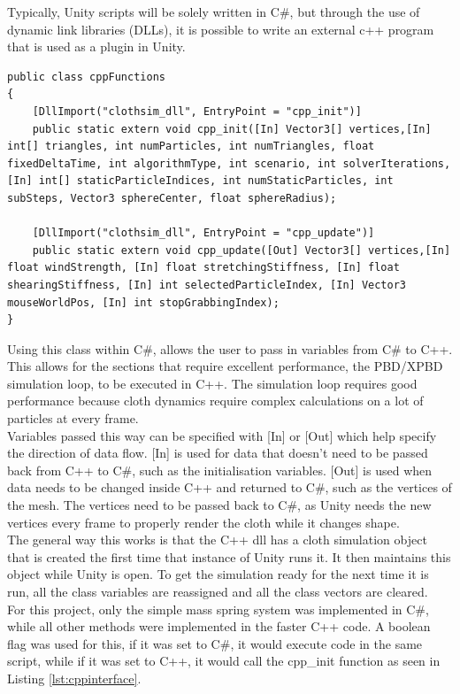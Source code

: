\documentclass[12pt,a4paper]{article}
\begin{document}
Typically, Unity scripts will be solely written in C\#, but through the use of dynamic link libraries (DLLs), it is possible to write an external c++ program that is used as a plugin in Unity.

\begin{lstlisting}[caption={Interfacing C++ functions with Unity},label={lst:cppinterface}]
public class cppFunctions
{
	[DllImport("clothsim_dll", EntryPoint = "cpp_init")]
	public static extern void cpp_init([In] Vector3[] vertices,[In] int[] triangles, int numParticles, int numTriangles, float fixedDeltaTime, int algorithmType, int scenario, int solverIterations, [In] int[] staticParticleIndices, int numStaticParticles, int subSteps, Vector3 sphereCenter, float sphereRadius);
	
	[DllImport("clothsim_dll", EntryPoint = "cpp_update")]
	public static extern void cpp_update([Out] Vector3[] vertices,[In] float windStrength, [In] float stretchingStiffness, [In] float shearingStiffness, [In] int selectedParticleIndex, [In] Vector3 mouseWorldPos, [In] int stopGrabbingIndex);
}\end{lstlisting}
Using this class within C\#, allows the user to pass in variables from C\# to C++. This allows for the sections that require excellent performance, the PBD/XPBD simulation loop, to be executed in C++. The simulation loop requires good performance because cloth dynamics require complex calculations on a lot of particles at every frame.\\ 

Variables passed this way can be specified with [In] or [Out] which help specify the direction of data flow. [In] is used for data that doesn't need to be passed back from C++ to C\#, such as the initialisation variables. [Out] is used when data needs to be changed inside C++ and returned to C\#, such as the vertices of the mesh. The vertices need to be passed back to C\#, as Unity needs the new vertices every frame to properly render the cloth while it changes shape.\\ 

The general way this works is that the C++ dll has a cloth simulation object that is created the first time that instance of Unity runs it. It then maintains this object while Unity is open. To get the simulation ready for the next time it is run, all the class variables are reassigned and all the class vectors are cleared. \\

For this project, only the simple mass spring system was implemented in C\#, while all other methods were implemented in the faster C++ code. A boolean flag was used for this, if it was set to C\#, it would execute code in the same script, while if it was set to C++, it would call the cpp\_init function as seen in Listing \ref{lst:cppinterface}. \\
\end{document}
